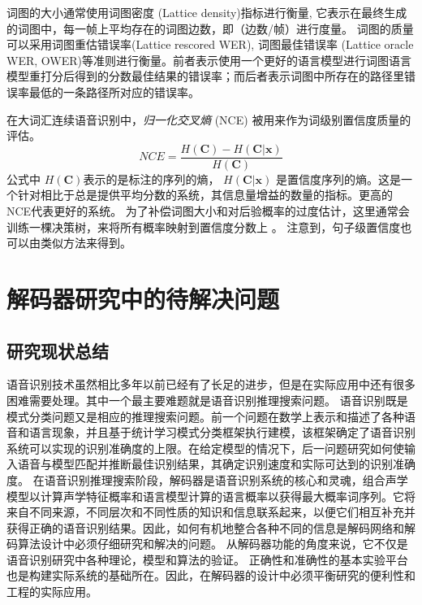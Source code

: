 词图的大小通常使用词图密度 (Lattice density)指标进行衡量, 它表示在最终生成的词图中，每一帧上平均存在的词图边数，即（边数/帧）进行度量。
词图的质量可以采用词图重估错误率(Lattice rescored WER), 词图最佳错误率 (Lattice oracle WER, OWER)等准则进行衡量。前者表示使用一个更好的语言模型进行词图语言模型重打分后得到的分数最佳结果的错误率；而后者表示词图中所存在的路径里错误率最低的一条路径所对应的错误率。

在大词汇连续语音识别中，{\em 归一化交叉熵 } (NCE) \cite{zhc00-chen-icassp2017} 被用来作为词级别置信度质量的评估。
     \begin{equation}\label{eq:nce}
    NCE=\frac{H(\mathbf{C})-H(\mathbf{C}|\mathbf{x})}{H(\mathbf{C})}
     \end{equation}
公式中 $H(\mathbf{C})$表示的是标注的序列的熵， $H(\mathbf{C}|\mathbf{x})$ 是置信度序列的熵。这是一个针对相比于总是提供平均分数的系统，其信息量增益的数量的指标。更高的NCE代表更好的系统。
% 
为了补偿词图大小和对后验概率的过度估计，这里通常会训练一棵决策树，来将所有概率映射到置信度分数上 \cite{evermann2000large}。 注意到，句子级置信度也可以由类似方法来得到。

\section{解码器研究中的待解决问题}
\label{chap:intro2-dec-future}
\subsection{研究现状总结}
\label{chap:intro2-dec-sumcur}

语音识别技术虽然相比多年以前已经有了长足的进步，但是在实际应用中还有很多困难需要处理。其中一个最主要难题就是语音识别推理搜索问题。
%
语音识别既是模式分类问题又是相应的推理搜索问题。前一个问题在数学上表示和描述了各种语音和语言现象，并且基于统计学习模式分类框架执行建模，该框架确定了语音识别系统可以实现的识别准确度的上限。在给定模型的情况下，后一问题研究如何使输入语音与模型匹配并推断最佳识别结果，其确定识别速度和实际可达到的识别准确度。
在语音识别推理搜索阶段，解码器是语音识别系统的核心和灵魂，组合声学模型以计算声学特征概率和语言模型计算的语言概率以获得最大概率词序列。它将来自不同来源，不同层次和不同性质的知识和信息联系起来，以便它们相互补充并获得正确的语音识别结果。因此，如何有机地整合各种不同的信息是解码网络和解码算法设计中必须仔细研究和解决的问题。
从解码器功能的角度来说，它不仅是语音识别研究中各种理论，模型和算法的验证。
正确性和准确性的基本实验平台也是构建实际系统的基础所在。因此，在解码器的设计中必须平衡研究的便利性和工程的实际应用。


